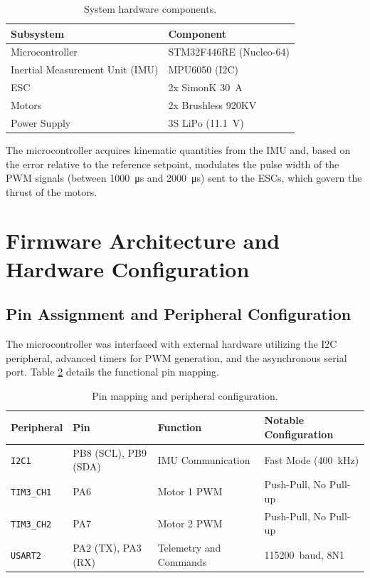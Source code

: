 \documentclass[11pt, a4paper]{article}
\begin{document}
\begin{table}[htbp]
\centering
\begin{tabular}{@{}ll@{}}
\toprule
\textbf{Subsystem} & \textbf{Component} \\ \midrule
Microcontroller & STM32F446RE (Nucleo-64) \\
Inertial Measurement Unit (IMU) & MPU6050 (I2C) \\
ESC & 2x SimonK \SI{30}{\ampere} \\
Motors & 2x Brushless 920KV \\
Power Supply & 3S LiPo (\SI{11.1}{\volt}) \\ \bottomrule
\end{tabular}
\caption{System hardware components.}
\label{tab:hardware}
\end{table}

The microcontroller acquires kinematic quantities from the IMU and, based on the error relative to the reference setpoint, modulates the pulse width of the PWM signals (between \SI{1000}{\micro\second} and \SI{2000}{\micro\second}) sent to the ESCs, which govern the thrust of the motors.

\section{Firmware Architecture and Hardware Configuration}
\subsection{Pin Assignment and Peripheral Configuration}
The microcontroller was interfaced with external hardware utilizing the I2C peripheral, advanced timers for PWM generation, and the asynchronous serial port. Table \ref{tab:pinout} details the functional pin mapping.

\begin{table}[htbp]
\centering
\begin{tabular}{@{}llll@{}}
\toprule
\textbf{Peripheral} & \textbf{Pin} & \textbf{Function} & \textbf{Notable Configuration} \\ \midrule
\texttt{I2C1} & PB8 (SCL), PB9 (SDA) & IMU Communication & Fast Mode (\SI{400}{\kilo\hertz}) \\
\texttt{TIM3\_CH1} & PA6 & Motor 1 PWM & Push-Pull, No Pull-up \\
\texttt{TIM3\_CH2} & PA7 & Motor 2 PWM & Push-Pull, No Pull-up \\
\texttt{USART2} & PA2 (TX), PA3 (RX) & Telemetry and Commands & \SI{115200}{baud}, 8N1 \\ \bottomrule
\end{tabular}
\caption{Pin mapping and peripheral configuration.}
\label{tab:pinout}
\end{table}
\end{document}
